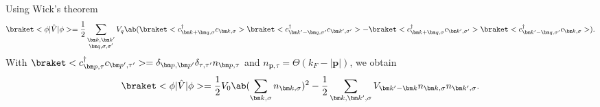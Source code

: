   \begin{solution}\leavevmode
  \begin{enumext}
    \item Using Wick's theorem
    \[
      \braket<\phi|\hat V|\phi>
    = \frac12 \sum_{\substack{\bm k, \bm k' \\ \bm q, \sigma, \sigma'}} V_q
      \ab(
        \braket<c_{\bm k + \bm q,\sigma}^\dagger c_{\bm k,\sigma}>
        \braket<c_{\bm k' - \bm q,\sigma'}^\dagger c_{\bm k',\sigma'}>
      - \braket<c_{\bm k + \bm q,\sigma}^\dagger c_{\bm k',\sigma'}>
        \braket<c_{\bm k' - \bm q,\sigma'}^\dagger c_{\bm k,\sigma}>).
    \]
    With $\braket<c_{\bm p,\tau}^\dagger c_{\bm p',\tau'}>
        = \delta_{\bm p,\bm p'}\delta_{\tau,\tau'} n_{\bm p,\tau}$ and
    $n_{\bm p,\tau} = \Theta(k_F - |\bm p|)$, we obtain
    \[
      \braket<\phi|\hat V|\phi>
    = \frac12 V_0 \ab(\sum_{\bm k,\sigma} n_{\bm k,\sigma} )^2
    - \frac12 \sum_{\bm k, \bm k', \sigma} V_{\bm k' - \bm k}
      n_{\bm k,\sigma} n_{\bm k',\sigma}.
    \]

\end{enumext}
\end{solution}

